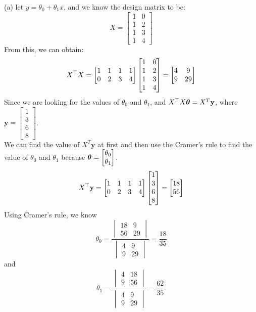 \documentclass[12pt,letterpaper]{hmcpset}
\begin{document}
\begin{solution}

(a) let $y = \theta_{0} + \theta_{1} x$, and we know the design matrix to be:
$$X = \begin{bmatrix}
	1 & 0\\
	1 & 2\\
	1 & 3\\
	1 & 4
\end{bmatrix}
$$
From this, we can obtain:
$$
X^{\top}X  = \begin{bmatrix}
	1 & 1 & 1 & 1\\
	0 & 2 & 3 & 4\\
\end{bmatrix}\begin{bmatrix}
	1 & 0\\
	1 & 2\\
	1 & 3\\
	1 & 4
\end{bmatrix}  = \begin{bmatrix}
4&9\\
9&29
\end{bmatrix}
$$
Since we are looking for the values of $ \theta_{0}$ and $ \theta_{1}$, and $X^{\top}X \hbox{\boldmath$\theta$} = X^{T}\textbf{y}$, where $\textbf{y} = \begin{bmatrix}
1\\3\\6\\8
\end{bmatrix}$.\\
We can find the value of $X^{T}\textbf{y}$ at first and then use the Cramer's rule to find the value of $ \theta_{0}$ and $ \theta_{1}$ because $\hbox{\boldmath$\theta$} = \begin{bmatrix}
\theta_{0}\\
\theta_{1}
\end{bmatrix}$. 
$$
X^\top\textbf{y} = \begin{bmatrix}
	1 & 1 & 1 & 1\\
	0 & 2 & 3 & 4\\
\end{bmatrix}\begin{bmatrix}
1\\3\\6\\8
\end{bmatrix} = \begin{bmatrix}
18\\
56
\end{bmatrix}
$$
Using Cramer's rule, we know
$$
\theta_{0} = \frac{\begin{vmatrix}
18&9\\
56&29
\end{vmatrix}}{\begin{vmatrix}
4&9\\
9&29
\end{vmatrix}} = \frac{18}{35}
$$
and 
$$
\theta_{1} = \frac{\begin{vmatrix}
4&18\\
9&56
\end{vmatrix}}{\begin{vmatrix}
4&9\\
9&29
\end{vmatrix}} = \frac{62}{35}.
$$



\end{solution}
\end{document}
